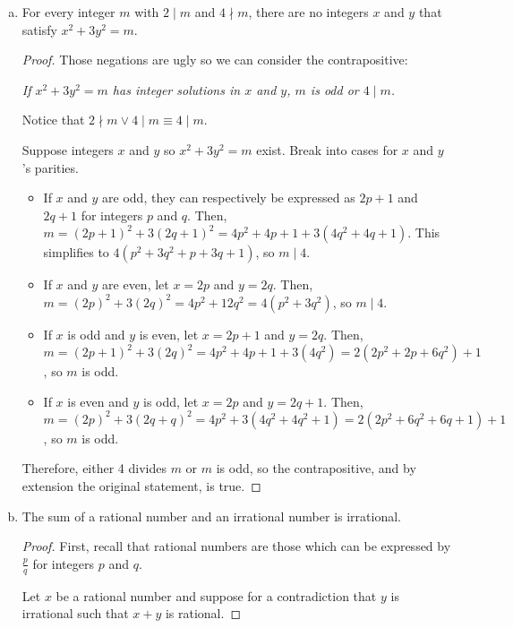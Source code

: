 \begin{enumerate}[(a)]
  \item For every integer $m$ with $2 \mid m$ and $4 \nmid m$, there are no integers $x$ and $y$ that satisfy $x^2 + 3y^2 = m$.
        \begin{proof}
          Those negations are ugly so we can consider the contrapositive:
          \begin{center}
            \emph{If $x^2 + 3y^2 = m$ has integer solutions in $x$ and $y$, $m$ is odd or $4 \mid m$.}
          \end{center}
          Notice that $2 \nmid m \lor 4 \mid m \equiv 4 \mid m$.

          Suppose integers $x$ and $y$ so $x^2 + 3y^2 = m$ exist.
          Break into cases for $x$ and $y$'s parities.

          \begin{itemize}
            \item If $x$ and $y$ are odd, they can respectively be expressed as $2p+1$ and $2q+1$ for integers $p$ and $q$.
                  Then, $m = (2p+1)^2 + 3(2q+1)^2 = 4p^2 + 4p + 1 + 3(4q^2 + 4q + 1)$.
                  This simplifies to $4(p^2+3q^2+p+3q+1)$, so $m \mid 4$.
            \item If $x$ and $y$ are even, let $x = 2p$ and $y = 2q$.
                  Then, $m = (2p)^2 + 3(2q)^2 = 4p^2 + 12q^2 = 4(p^2 + 3q^2)$, so $m \mid 4$.
            \item If $x$ is odd and $y$ is even, let $x = 2p+1$ and $y = 2q$.
                  Then, $m = (2p+1)^2 + 3(2q)^2 = 4p^2 + 4p + 1 + 3(4q^2) = 2(2p^2 + 2p + 6q^2) + 1$, so $m$ is odd.
            \item If $x$ is even and $y$ is odd, let $x = 2p$ and $y = 2q+1$.
                  Then, $m = (2p)^2 + 3(2q+q)^2 = 4p^2 + 3(4q^2+4q^2+1) = 2(2p^2 + 6q^2 + 6q + 1) + 1$, so $m$ is odd.
          \end{itemize}

          Therefore, either 4 divides $m$ or $m$ is odd, so the contrapositive, and by extension the original statement, is true.
        \end{proof}

  \item The sum of a rational number and an irrational number is irrational.
        \begin{proof}
          First, recall that rational numbers are those which can be expressed by $\frac{p}{q}$ for integers $p$ and $q$.

          Let $x$ be a rational number and suppose for a contradiction that $y$ is irrational such that $x+y$ is rational.


\end{proof}
\end{enumerate}

